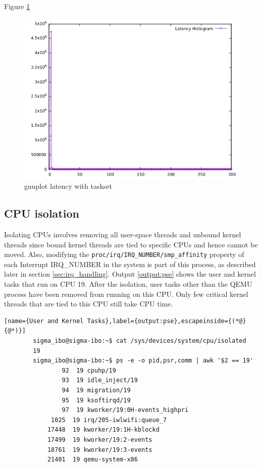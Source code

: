\documentclass[MMR,Master,english]{twbook}
\begin{document}
Figure \ref{fig:gnuplot_max_latency_vapic}
\begin{figure}[H]
	\centering
	\includegraphics[width=0.8\columnwidth]{masterthesis-documentation/docs/sigmatek/xenomai/vapic/gnuplot_max_latency_vapic.png}
	\caption[gnuplot latency with taskset]{gnuplot latency with taskset}
	\label{fig:gnuplot_max_latency_vapic}
\end{figure}


\clearpage

\subsection{CPU isolation}
Isolating CPUs involves removing all user-space threads and unbound kernel threads since bound kernel threads are tied to specific CPUs and hence cannot be moved. Also, modifying the \texttt{proc/irq/IRQ\_NUMBER/smp\_affinity} property of each Interrupt IRQ\_NUMBER in the system is part of this process, as described later in section \ref{sec:irq_handling}. Output \ref{output:pse} shows the user and kernel tasks that run on CPU 19. After the isolation, user tasks other than the QEMU process have been removed from running on this CPU. Only few critical kernel threads that are tied to this CPU still take CPU time.

\vspace{1em}
\begin{minipage}{0.95\columnwidth}
	\begin{lstlisting}[name={User and Kernel Tasks},label={output:pse},escapeinside={(*@}{@*)}]
		sigma_ibo@sigma-ibo:~$ cat /sys/devices/system/cpu/isolated
		19
		sigma_ibo@sigma-ibo:~$ ps -e -o pid,psr,comm | awk '$2 == 19'
				92  19 cpuhp/19
				93  19 idle_inject/19
 	    		94  19 migration/19
 	    		95  19 ksoftirqd/19
 	    		97  19 kworker/19:0H-events_highpri
 	 		 1025  19 irq/205-iwlwifi:queue_7
 	 		17448  19 kworker/19:1H-kblockd
 	 		17499  19 kworker/19:2-events
 	 		18761  19 kworker/19:3-events
			21401  19 qemu-system-x86
\end{lstlisting}
\end{minipage}
\end{document}
